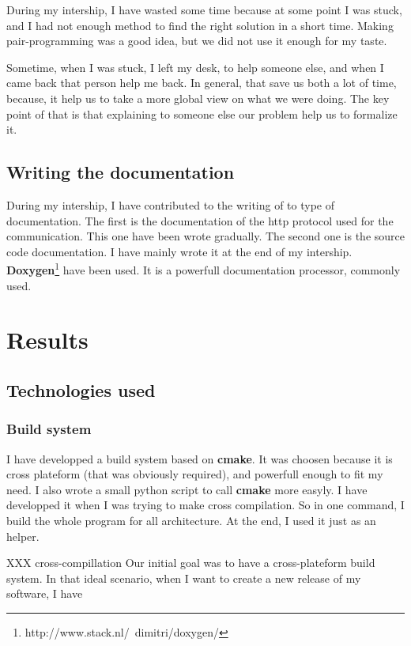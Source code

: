 \documentclass[a4paper,11pt]{custom}
\newcommand{\cmake}{\textbf{cmake}}
\begin{document}
During my intership, I have wasted some time because at some point I was stuck,
and I had not enough method to find the right solution in a short time. Making
pair-programming was a good idea, but we did not use it enough for my taste.

Sometime, when I was stuck, I left my desk, to help someone else, and when I
came back that person help me back. In general, that save us both a lot of time,
because, it help us to take a more global view on what we were doing. The key
point of that is that explaining to someone else our problem help us to
formalize it.

\section{Writing the documentation}

During my intership, I have contributed to the writing of to type of
documentation. The first is the documentation of the http protocol used for the
communication. This one have been wrote gradually. The second one is the source
code documentation. I have mainly wrote it at the end of my intership.
\textbf{Doxygen}\footnote{http://www.stack.nl/~dimitri/doxygen/} have been used.
It is a powerfull documentation processor, commonly used.

\chapter{Results}

\section{Technologies used}

\subsection{Build system}

I have developped a build system based on \cmake. It was choosen because it is
cross plateform (that was obviously required), and powerfull enough to fit my
need. I also wrote a small python script to call \cmake{} more easyly. I have
developped it when I was trying to make cross compilation. So in one command, I
build the whole program for all architecture. At the end, I used it just as an
helper.

XXX
cross-compillation
Our initial goal was to have a cross-plateform build system. In that ideal
scenario, when I want to create a new release of my software, I have
\end{document}
